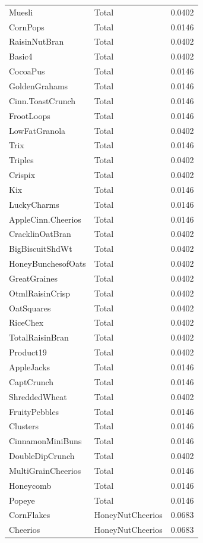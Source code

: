 \begin{longtable}{llr}
Muesli & Total & 0.0402 \\
CornPops & Total & 0.0146 \\
RaisinNutBran & Total & 0.0402 \\
Basic4 & Total & 0.0402 \\
CocoaPus & Total & 0.0146 \\
GoldenGrahams & Total & 0.0146 \\
Cinn.ToastCrunch & Total & 0.0146 \\
FrootLoops & Total & 0.0146 \\
LowFatGranola & Total & 0.0402 \\
Trix & Total & 0.0146 \\
Triples & Total & 0.0402 \\
Crispix & Total & 0.0402 \\
Kix & Total & 0.0146 \\
LuckyCharms & Total & 0.0146 \\
AppleCinn.Cheerios & Total & 0.0146 \\
CracklinOatBran & Total & 0.0402 \\
BigBiscuitShdWt & Total & 0.0402 \\
HoneyBunchesofOats & Total & 0.0402 \\
GreatGraines & Total & 0.0402 \\
OtmlRaisinCrisp & Total & 0.0402 \\
OatSquares & Total & 0.0402 \\
RiceChex & Total & 0.0402 \\
TotalRaisinBran & Total & 0.0402 \\
Product19 & Total & 0.0402 \\
AppleJacks & Total & 0.0146 \\
CaptCrunch & Total & 0.0146 \\
ShreddedWheat & Total & 0.0402 \\
FruityPebbles & Total & 0.0146 \\
Clusters & Total & 0.0146 \\
CinnamonMiniBuns & Total & 0.0146 \\
DoubleDipCrunch & Total & 0.0402 \\
MultiGrainCheerios & Total & 0.0146 \\
Honeycomb & Total & 0.0146 \\
Popeye & Total & 0.0146 \\
CornFlakes & HoneyNutCheerios & 0.0683 \\
Cheerios & HoneyNutCheerios & 0.0683 \\

\end{longtable}
